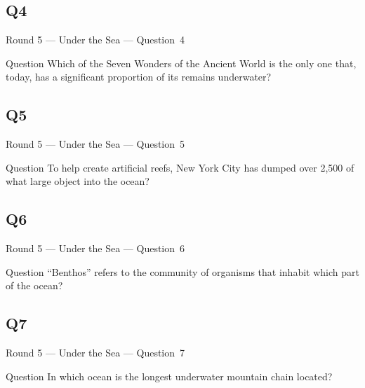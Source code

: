 \documentclass[11pt,draft]{beamer}
\begin{document}
\subsection*{Q4}
\begin{frame}[t]{Round 5 --- Under the Sea --- \mbox{Question 4}}
    \begin{block}{Question}
        Which of the Seven Wonders of the Ancient World is the only one that, today, has a significant proportion of its remains underwater?
    \end{block}
\end{frame}
\subsection*{Q5}
\begin{frame}[t]{Round 5 --- Under the Sea --- \mbox{Question 5}}
    \begin{block}{Question}
        To help create artificial reefs, New York City has dumped over 2,500 of what large object into the ocean?
    \end{block}
\end{frame}
\subsection*{Q6}
\begin{frame}[t]{Round 5 --- Under the Sea --- \mbox{Question 6}}
    \begin{block}{Question}
        ``Benthos'' refers to the community of organisms that inhabit which part of the ocean?
    \end{block}
\end{frame}
\subsection*{Q7}
\begin{frame}[t]{Round 5 --- Under the Sea --- \mbox{Question 7}}
    \begin{block}{Question}
        In which ocean is the longest underwater mountain chain located?
    \end{block}
\end{frame}
\end{document}
